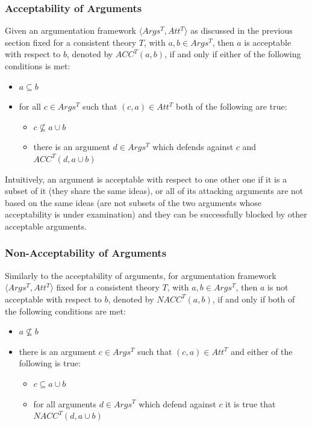 \documentclass[11pt,twoside,a4paper]{report}
\begin{document}
\subsubsection{Acceptability of Arguments}
Given an argumentation framework $\langle Args^T, Att^T\rangle$ as discussed in the previous section fixed for a consistent theory $T$, with $a,b\in Args^T$, then $a$ is acceptable with respect to $b$, denoted by $ACC^T(a,b)$, if and only if either of the following conditions is met:
\begin{itemize}
\item
$a\subseteq b$
\item
for all $c\in Args^T$ such that $(c,a)\in Att^T$ both of the following are true:
\begin{itemize}
\item
$c\nsubseteq a\cup b$
\item
there is an argument $d\in Args^T$ which defends against $c$ and $ACC^T(d,a\cup b)$
\end{itemize}
\end{itemize}

Intuitively, an argument is acceptable with respect to one other one if it is a subset of it (they share the same ideas), or all of its attacking arguments are not based on the same ideas (are not subsets of the two arguments whose acceptability is under examination) and they can be successfully blocked by other acceptable arguments.

\subsubsection{Non-Acceptability of Arguments}
\label{subsec:nacc}
Similarly to the acceptability of arguments, for argumentation framework $\langle Args^T, Att^T\rangle$ fixed for a consistent theory $T$, with $a,b\in Args^T$, then $a$ is not acceptable with respect to $b$, denoted by $NACC^T(a,b)$, if and only if both of the following conditions are met:
\begin{itemize}
\item
$a\nsubseteq b$
\item
there is an argument $c\in Args^T$ such that $(c,a)\in Att^T$ and either of the following is true:
\begin{itemize}
\item
$c\subseteq a\cup b$
\item
for all arguments $d\in Args^T$ which defend against $c$ it is true that $NACC^T(d,a\cup b)$
\end{itemize}
\end{itemize}
\end{document}
